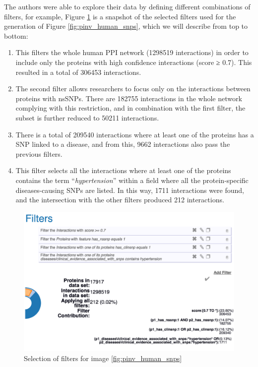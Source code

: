 The authors were able to explore their data by defining different combinations of filters, for example, Figure \ref{fig:pinv_prefilters_snp} is a snapshot of the selected filters used for the generation of Figure \ref{fig:pinv_human_snps}, which we will describe from top to bottom: 
\begin{enumerate}
\setlength\itemsep{-0.5em}
\item This filters the whole human PPI network (1298519 interactions) in order to include only the proteins with high confidence interactions (score ≥ 0.7). This resulted in a total of 306453 interactions.
\item The second filter allows researchers to focus only on the interactions between proteins with nsSNPs. There are 182755 interactions in the whole network complying with this restriction, and in combination with the first filter, the subset is further reduced to 50211 interactions.
\item There is a total of 209540 interactions where at least one of the proteins has a SNP linked to a disease, and from this, 9662 interactions also pass the previous filters.
\item This filter selects all the interactions where at least one of the proteins contains the term ``\emph{hypertension}'' within a field where all the protein-specific diseases-causing SNPs are listed. In this way, 1711 interactions were found, and the intersection with the other filters produced 212 interactions.
\end{enumerate}

\begin{figure}
\centering
\includegraphics[width=5in]{figures/pinv_prefilters_snp.png}
\caption[Selection of filters for image \ref{fig:pinv_human_snps}]{Selection of filters for image \ref{fig:pinv_human_snps}
\label{fig:pinv_prefilters_snp}}
\end{figure}


